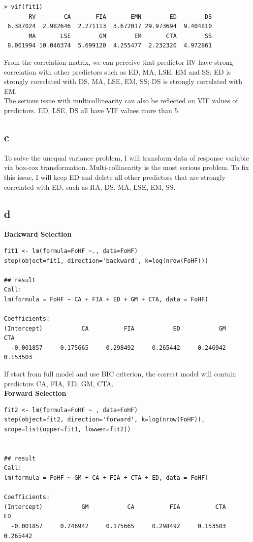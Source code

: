 \documentclass[11pt,letterpaper]{article}
\begin{document}
\begin{verbatim}
> vif(fit1)
       RV        CA       FIA       EMN        ED        DS 
 6.387024  2.982646  2.271113  3.672017 29.973694  9.404810 
       MA       LSE        GM        EM       CTA        SS 
 8.001994 10.046374  5.699120  4.255477  2.232320  4.972861 
\end{verbatim}

\noindent From the correlation matrix, we can perceive that predictor RV have strong correlation with other predictors such as ED, MA, LSE, EM and SS; ED is strongly correlated with DS, MA, LSE, EM, SS; DS is strongly correlated with EM. \\

\noindent The serious issue with multicollinearity can also be reflected on VIF values of predictors. ED, LSE, DS all have VIF values more than 5. 

\subsection*{c}
\noindent To solve the unequal variance problem, I will transform data of response variable via box-cox transformation. Multi-collinearity is the most serious problem. To fix this issue, I will keep ED and delete all other predictors that are strongly correlated with ED, such as RA, DS, MA, LSE, EM, SS. 

\subsection*{d}
\textbf{Backward Selection}
\begin{verbatim}
fit1 <- lm(formula=FoHF ~., data=FoHF)
step(object=fit1, direction='backward', k=log(nrow(FoHF)))

## result 
Call:
lm(formula = FoHF ~ CA + FIA + ED + GM + CTA, data = FoHF)

Coefficients:
(Intercept)           CA          FIA           ED           GM          CTA  
  -0.001857     0.175665     0.298492     0.265442     0.246942     0.153503  
\end{verbatim}

\noindent If start from full model and use BIC criterion, the correct model will contain predictors CA, FIA, ED, GM, CTA. \\

\noindent \textbf{Forward Selection}
\begin{verbatim}
fit2 <- lm(formula=FoHF ~ , data=FoHF)
step(object=fit2, direction='forward', k=log(nrow(FoHF)), scope=list(upper=fit1, lowwer=fit2))


## result
Call:
lm(formula = FoHF ~ GM + CA + FIA + CTA + ED, data = FoHF)

Coefficients:
(Intercept)           GM           CA          FIA          CTA           ED  
  -0.001857     0.246942     0.175665     0.298492     0.153503     0.265442  

\end{verbatim}
\end{document}
